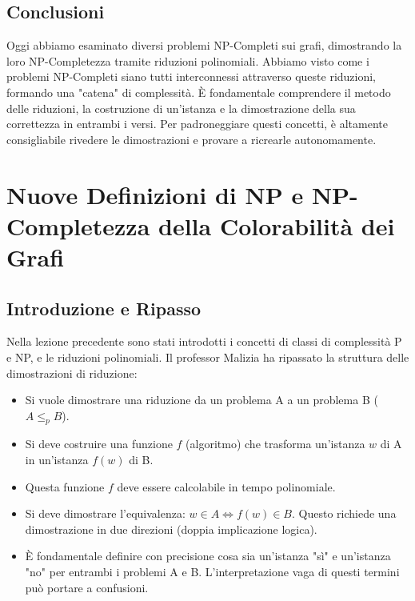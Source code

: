 \documentclass[a4paper, 11pt]{book} %
\theoremstyle{definition}
\begin{document}
\section{Conclusioni}
Oggi abbiamo esaminato diversi problemi NP-Completi sui grafi, dimostrando la loro NP-Completezza tramite riduzioni polinomiali. Abbiamo visto come i problemi NP-Completi siano tutti interconnessi attraverso queste riduzioni, formando una "catena" di complessità. È fondamentale comprendere il metodo delle riduzioni, la costruzione di un'istanza e la dimostrazione della sua correttezza in entrambi i versi. Per padroneggiare questi concetti, è altamente consigliabile rivedere le dimostrazioni e provare a ricrearle autonomamente.



\chapter{Nuove Definizioni di NP e NP-Completezza della Colorabilità dei Grafi}



\section{Introduzione e Ripasso}
Nella lezione precedente sono stati introdotti i concetti di classi di complessità P e NP, e le riduzioni polinomiali.
Il professor Malizia ha ripassato la struttura delle dimostrazioni di riduzione:
\begin{itemize}
    \item Si vuole dimostrare una riduzione da un problema A a un problema B ($A \le_p B$).
    \item Si deve costruire una funzione $f$ (algoritmo) che trasforma un'istanza $w$ di A in un'istanza $f(w)$ di B.
    \item Questa funzione $f$ deve essere calcolabile in tempo polinomiale.
    \item Si deve dimostrare l'equivalenza: $w \in A \iff f(w) \in B$. Questo richiede una dimostrazione in due direzioni (doppia implicazione logica).
    \item È fondamentale definire con precisione cosa sia un'istanza "sì" e un'istanza "no" per entrambi i problemi A e B. L'interpretazione vaga di questi termini può portare a confusioni.
\end{itemize}
\end{document}
